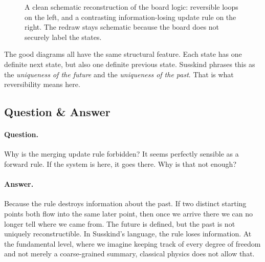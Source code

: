 \begin{figure}[h]
\centering
{}
\caption{A clean schematic reconstruction of the board logic: reversible loops on the left, and a contrasting information-losing update rule on the right. The redraw stays schematic because the board does not securely label the states.}
\end{figure}

The good diagrams all have the same structural feature. Each state has one definite next state, but also one definite previous state. Susskind phrases this as the \emph{uniqueness of the future} and the \emph{uniqueness of the past}. That is what reversibility means here.

\subsection{Question \& Answer}

\paragraph{Question.} Why is the merging update rule forbidden? It seems perfectly sensible as a forward rule. If the system is here, it goes there. Why is that not enough?

\paragraph{Answer.} Because the rule destroys information about the past. If two distinct starting points both flow into the same later point, then once we arrive there we can no longer tell where we came from. The future is defined, but the past is not uniquely reconstructible. In Susskind's language, the rule loses information. At the fundamental level, where we imagine keeping track of every degree of freedom and not merely a coarse-grained summary, classical physics does not allow that.

